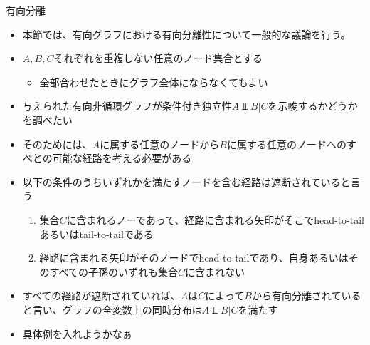 \begin{frame}{有向分離}
 \begin{itemize}
  \item 本節では、有向グラフにおける有向分離性について一般的な議論を行う。
  \item $A,B,C$それぞれを重複しない任意のノード集合とする
        \begin{itemize}
         \item 全部合わせたときにグラフ全体にならなくてもよい
        \end{itemize}
  \item 与えられた有向非循環グラフが条件付き独立性$A\Perp B|C$を示唆するかどうかを調べたい
  \item そのためには、$A$に属する任意のノードから$B$に属する任意のノードへのすべとの可能な経路を考える必要がある
  \item 以下の条件のうちいずれかを満たすノードを含む経路は遮断されていると言う
        \begin{enumerate}
         \item 集合$C$に含まれるノーであって、経路に含まれる矢印がそこでhead-to-tailあるいはtail-to-tailである
         \item 経路に含まれる矢印がそのノードでhead-to-tailであり、自身あるいはそのすべての子孫のいずれも集合$C$に含まれない
        \end{enumerate}
  \item すべての経路が遮断されていれば、$A$は$C$によって$B$から有向分離されていると言い、グラフの全変数上の同時分布は$A \Perp B|C$を満たす
  \item 具体例を入れようかなぁ %
 \end{itemize}
\end{frame}
